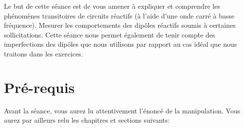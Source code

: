 \pagestyle{fancy}
\cfoot{}
\usepackage{placeins}



\setlength{\parskip}{0.5cm plus4mm minus3mm} %
\setlength{\parindent}{0pt}





Le but de cette séance est de vous amener à expliquer et comprendre les phénomènes transitoires de circuits réactifs (à l'aide d'une onde carré à basse fréquence).
Mesurer les comportements des dipôles réactifs soumis à certaines sollicitations. 
Cette séance nous permet également de tenir compte des imperfections des dipôles que nous utilisons par rapport au cas idéal que nous traitons dans les exercices.

\section{Pré-requis}
Avant la séance, vous aurez lu attentivement l'énoncé de la manipulation. Vous aurez par ailleurs relu les chapitres et sections suivants:

